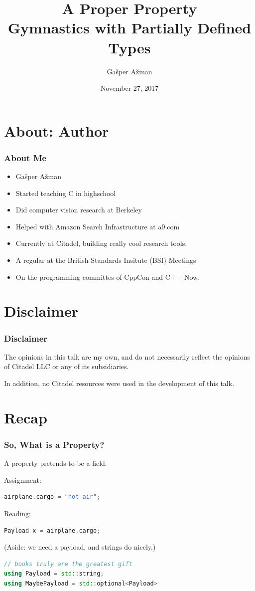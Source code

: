 \documentclass{beamer}
\title{A Proper Property\\
       \cplusplus Gymnastics with Partially Defined Types}
\author{Gašper Ažman}
\date{November 27, 2017}
\newcommand{\CC}{C\nolinebreak\hspace{-.05em}\raisebox{0.4ex}{\resizebox{!}{0.6\baselineskip}{\bf++}}}
\newcommand{\cplusplus}{\protect\CC\xspace}
\newcommand{\nl}{\vspace{0.2\baselineskip}}
\begin{document}
\begin{frame}
  \titlepage
\end{frame}


\section{About: Author}
\begin{frame}
  \frametitle{About Me}
  \begin{itemize}
    \item Gašper Ažman
    \item Started teaching \cplusplus in highschool
    \item Did computer vision research at Berkeley
    \item Helped with Amazon Search Infrastructure at a9.com
    \item Currently at Citadel, building really cool research tools.
    \item A regular at the British Standards Insitute (BSI) Meetings
    \item On the programming committes of CppCon and C$++$Now.
  \end{itemize}
\end{frame}

\section{Disclaimer}

\begin{frame}
\frametitle{Disclaimer}
The opinions in this talk are my own, and do not necessarily reflect the
opinions of Citadel LLC or any of its subsidiaries.\nl

In addition, no Citadel resources were used in the development of this talk.
\end{frame}


\section{Recap}
\begin{frame}[fragile]

\frametitle{So, What is a Property?}
\begin{center}
{\Large A property pretends to be a field.}
\end{center}

Assignment:
\begin{lstlisting}[language=cpp]
airplane.cargo = "hot air";
\end{lstlisting}

Reading:
\begin{lstlisting}[language=cpp]
Payload x = airplane.cargo;
\end{lstlisting}

(Aside: we need a payload, and strings do nicely.)
\begin{lstlisting}[language=cpp]
// books truly are the greatest gift
using Payload = std::string;
using MaybePayload = std::optional<Payload>
\end{lstlisting}

\end{frame}
\end{document}
